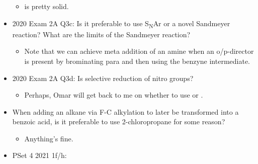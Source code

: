 \documentclass[../notes.tex]{subfiles}
\begin{document}
\begin{itemize}
    \begin{itemize}
        \item {} is pretty solid.
    \end{itemize}
    \item 2020 Exam 2A Q3c: Is it preferable to use S\textsubscript{N}Ar or a novel Sandmeyer reaction? What are the limits of the Sandmeyer reaction?
    \begin{itemize}
        \item Note that we can achieve meta addition of an amine when an o/p-director is present by brominating para and then using the benzyne intermediate.
    \end{itemize}
    \item 2020 Exam 2A Q3d: Is  selective reduction of nitro groups?
    \begin{itemize}
        \item Perhaps, Omar will get back to me on whether to use  or .
    \end{itemize}
    \item When adding an alkane via F-C alkylation to later be transformed into a benzoic acid, is it preferable to use 2-chloropropane for some reason?
    \begin{itemize}
        \item Anything's fine.
    \end{itemize}
    \item PSet 4 2021 1f/h:
    \begin{figure}[H]
        \centering
\end{figure}
\end{itemize}
\end{document}
